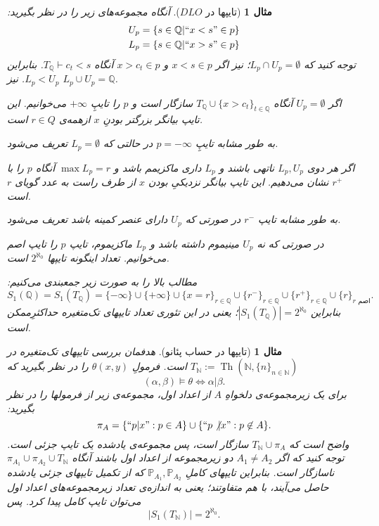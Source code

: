 \documentclass[12pt,a4paper]{report}
\theoremstyle{colorhead}
\newtheorem{mesal}[thm]{مثال}
\DeclareMathOperator{\Th}{Th}
\begin{document}
\begin{mesal}[تایپها در
$DLO$]
آنگاه مجموعه‌های زیر را در نظر بگیرید:
\begin{align*}
& U_p=\{s\in \mathbb{Q}|``x<s"\in p\}
\\
& 
L_p=\{s\in \mathbb{Q}|``x>s"\in p\}
\end{align*}
توجه کنید که
$L_p\cap U_p=\emptyset$؛
نیز اگر
$x<s\in p$
و
$x>c_t\in p$
آنگاه
$T_\mathbb{Q}\vdash c_t<s$.
بنابراین
$L_p<U_p$.
نیز
$L_p\cup U_p=\mathbb{Q}$.
\par 
اگر
$U_p=\emptyset$
آنگاه 
$T_\mathbb{Q}\cup \{x>c_t\}_{t\in \mathbb{Q}}$
سازگار است و 
$p$
را تایپِ 
$+\infty$
می‌خوانیم. این تایپ بیانگر بزرگتر بودنِ
$x$
ازهمه‌ی 
$r\in Q$
است.
\par 
به طور مشابه تایپِ
$p=-\infty$
در حالتی که 
$L_p=\emptyset$
تعریف می‌شود.
\par 
اگر هر دوی
$L_p,U_p$
ناتهی باشند و 
$L_p$
داری ماکزیمم باشد و 
$\max L_p=r$
آنگاه 
$p$
را
با
$r^+$
نشان می‌دهیم. این تایپ بیانگر نزدیکیِ بودن
$x$
از طرف راست
به عدد گویای 
$r$
است. 
\par 
به طور مشابه تایپ
$r^-$
در صورتی که
$U_p$
دارای عنصر کمینه باشد تعریف می‌شود. 
\par 
در صورتی که نه
$U_p$
مینیموم داشته باشد و 
$L_p$
ماکزیموم، تایپ
$p$
را تایپ اصم می‌خوانیم. تعداد اینگونه تایپها
$2^{\aleph_0}$
است. 
\par 
مطالب بالا را به صورت زیر جمعبندی می‌کنیم:
\[
S_1(\mathbb{Q})=S_1(T_\mathbb{Q})=\{-\infty\}\cup \{+\infty\}\cup
\{x=r\}_{r\in \mathbb{Q}}\cup \{r^-\}_{r\in \mathbb{Q}}\cup \{r^+\}_{r\in \mathbb{Q}}\cup \{r\}_{\text{$r$ اصم}}.
\]
بنابراین
$|S_1(T_\mathbb{Q})|=2^{\aleph_0}$؛
یعنی در این تئوری تعداد تایپهای تک‌متغیره حداکثرِ‌ممکن است. 
\end{mesal}
\begin{mesal}[تایپها در حساب پئانو]
هدفمان بررسی تایپهای تک‌متغیره در 
$T_\mathbb{N}:=\Th(\mathbb{N}, \{n\}_{n\in \mathbb{N}})$
است. 
فرمولِ
$\theta(x,y)$
را در نظر بگیرید که
\[
(\alpha,\beta)\models \theta \Leftrightarrow \alpha|\beta.
\]
برای یک زیرمجموعه‌ی دلخواهِ
$A$
از اعداد اول، مجموعه‌ی زیر از فرمولها را در نظر بگیرید:
\[
\pi_A=\{``p|x": p\in A\}\cup \{``p\not|x":p\not\in A\}.
\]
واضح است که 
$T_\mathbb{N}\cup \pi_A$
سازگار است، پس مجموعه‌ی یادشده یک تایپ جزئی است. توجه کنید که اگر
$A_1\not=A_2$
دو زیرمجموعه از اعداد اول باشند آنگاه
$\pi_{A_1}\cup\pi_{A_2}\cup T_\mathbb{N}$
ناسازگار است. بنابراین تایپهای کاملِ
$\mathbb{P}_{A_1},\mathbb{P}_{A_2}$
که از تکمیل تایپهای جزئی یادشده حاصل می‌آیند، با هم متفاوتند؛ یعنی به اندازه‌ی تعداد زیرمجموعه‌های اعداد اول می‌توان تایپ کامل پیدا کرد. پس
\[
|S_1(T_\mathbb{N})|=2^{\aleph_0}.
\]
\end{mesal}
\end{document}
